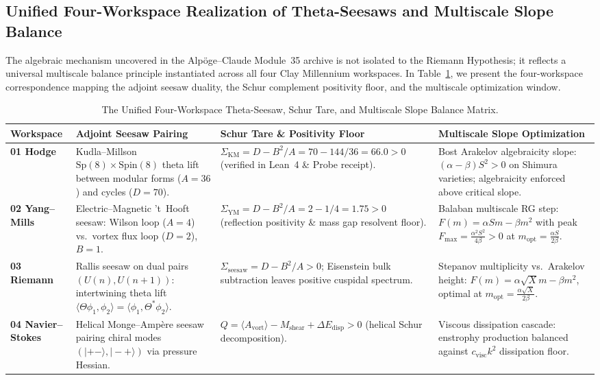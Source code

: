 \documentclass[11pt,a4paper]{article}
\begin{document}
\subsection{Unified Four-Workspace Realization of Theta-Seesaws and Multiscale Slope Balance}

The algebraic mechanism uncovered in the Alp\"{o}ge--Claude Module~35 archive is not isolated to the Riemann Hypothesis; it reflects a universal multiscale balance principle instantiated across all four Clay Millennium workspaces. In Table~\ref{tab:unified_seesaw_multiscale}, we present the four-workspace correspondence mapping the adjoint seesaw duality, the Schur complement positivity floor, and the multiscale optimization window.

\begin{table}[htbp]
\centering
\caption{The Unified Four-Workspace Theta-Seesaw, Schur Tare, and Multiscale Slope Balance Matrix.}
\label{tab:unified_seesaw_multiscale}
\footnotesize
\begin{tabular}{@{}>{\raggedright\arraybackslash}p{2.2cm}>{\raggedright\arraybackslash}p{3.8cm}>{\raggedright\arraybackslash}p{3.8cm}>{\raggedright\arraybackslash}p{4.2cm}@{}}
\toprule
\textbf{Workspace} & \textbf{Adjoint Seesaw Pairing} & \textbf{Schur Tare \& Positivity Floor} & \textbf{Multiscale Slope Optimization} \\
\midrule
\textbf{01 Hodge} & Kudla--Millson $\mathrm{Sp}(8) \times \mathrm{Spin}(8)$ theta lift between modular forms ($A=36$) and cycles ($D=70$). & $\Sigma_{\mathrm{KM}} = D - B^2/A = 70 - 144/36 = 66.0 > 0$ (verified in Lean~4 \& Probe receipt). & Bost Arakelov algebraicity slope: $(\alpha - \beta)S^2 > 0$ on Shimura varieties; algebraicity enforced above critical slope. \\
\addlinespace
\textbf{02 Yang--Mills} & Electric--Magnetic 't~Hooft seesaw: Wilson loop ($A=4$) vs.\ vortex flux loop ($D=2$), $B=1$. & $\Sigma_{\mathrm{YM}} = D - B^2/A = 2 - 1/4 = 1.75 > 0$ (reflection positivity \& mass gap resolvent floor). & Balaban multiscale RG step: $F(m) = \alpha S m - \beta m^2$ with peak $F_{\max} = \frac{\alpha^2 S^2}{4\beta} > 0$ at $m_{\mathrm{opt}} = \frac{\alpha S}{2\beta}$. \\
\addlinespace
\textbf{03 Riemann} & Rallis seesaw on dual pairs $(U(n), U(n+1))$: intertwining theta lift $\langle \Theta \phi_1, \phi_2 \rangle = \langle \phi_1, \Theta^* \phi_2 \rangle$. & $\Sigma_{\mathrm{seesaw}} = D - B^2/A > 0$; Eisenstein bulk subtraction leaves positive cuspidal spectrum. & Stepanov multiplicity vs.\ Arakelov height: $F(m) = \alpha\sqrt{X}m - \beta m^2$, optimal at $m_{\mathrm{opt}} = \frac{\alpha\sqrt{X}}{2\beta}$. \\
\addlinespace
\textbf{04 Navier--Stokes} & Helical Monge--Amp\`ere seesaw pairing chiral modes $(|+-\rangle, |-+\rangle)$ via pressure Hessian. & $Q = \langle A_{\mathrm{vort}} \rangle - M_{\mathrm{shear}} + \Delta E_{\mathrm{disp}} > 0$ (helical Schur decomposition). & Viscous dissipation cascade: enstrophy production balanced against $c_{\mathrm{visc}} k^2$ dissipation floor. \\
\bottomrule
\end{tabular}
\end{table}
\end{document}
